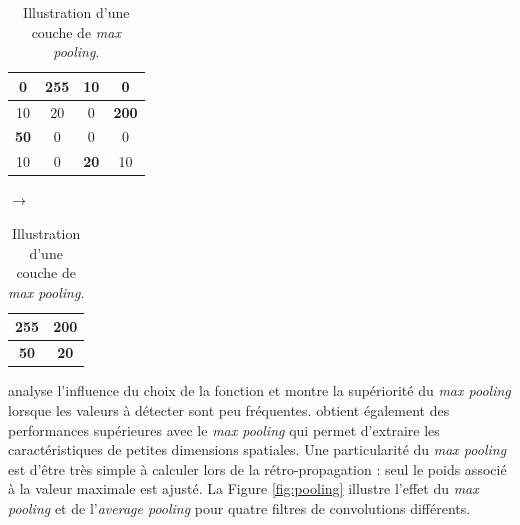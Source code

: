 \begin{table}[]
    \centering
    \begin{tabular}{|c|c||c|c|}
        \hline
                  0 & \textbf{255} &          10 &            0 \\ \hline
                 10 &           20 &           0 & \textbf{200} \\ \hline \hline
        \textbf{50} &            0 &           0 &            0 \\ \hline
                 10 &            0 & \textbf{20} &           10 \\ \hline
    \end{tabular}
    \quad
    $\rightarrow$
    \quad
    \begin{tabular}{|c||c|}
        \hline
        \textbf{255} & \textbf{200} \\ \hline \hline
        \textbf{50}  & \textbf{20}  \\ \hline
    \end{tabular}
    \caption{Illustration d'une couche de \emph{max pooling}.}
    \label{tab:maxpooling}
\end{table}

\cite{boureau_theoretical_2010} analyse l'influence du choix de la fonction et montre la supériorité du \textit{max pooling} lorsque les valeurs à détecter sont peu fréquentes.
\cite{scherer_evaluation_2010} obtient également des performances supérieures avec le \textit{max pooling} qui permet d'extraire les caractéristiques de petites dimensions spatiales.
Une particularité du \textit{max pooling} est d'être très simple à calculer lors de la rétro-propagation : seul le poids associé à la valeur maximale est ajusté.
La Figure \ref{fig:pooling} illustre l'effet du \textit{max pooling} et de l'\textit{average pooling} pour quatre filtres de convolutions différents.

